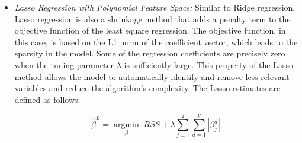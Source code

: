 \begin{itemize}
\item
  \emph{Lasso Regression with Polynomial Feature Space:}
  Similar to Ridge regression, Lasso regression is also a shrinkage method that adds a penalty term to the objective function of the least square regression. The objective function, in this case, is based on the L1 norm of the coefficient vector, which leads to the sparsity in the model. Some of the regression coefficients are precisely zero when the tuning parameter \(\lambda\) is sufficiently large. This property of the Lasso method allows the model to automatically identify and remove less relevant variables and reduce the algorithm's complexity. The Lasso estimates are defined as follows:

  \begin{equation}
  \hat{\beta}^L = \operatorname*{argmin}_{\beta} \; RSS + \lambda \sum_{j=1}^{2} \sum_{d=1}^{p} | \beta_j^d |.
  \label{eq:lassoParam}
  \end{equation}


\end{itemize}
